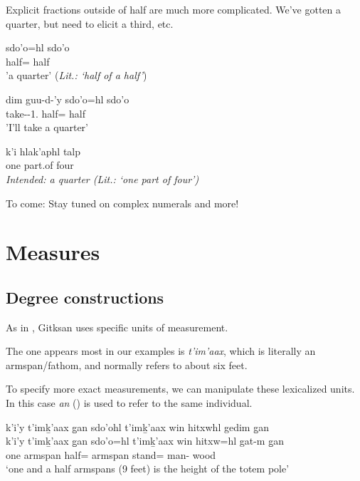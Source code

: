 \documentclass{article}
\begin{document}
Explicit fractions outside of half are much more complicated. We've gotten a quarter, but need to elicit a third, etc.
\begin{exe}
    \ex \begin{xlist}
    \item \gll sdo'o=hl sdo'o\\
half=\Cn{} half\\
'a quarter' (\textit{Lit.: `half of a half'})
\item \gll dim guu-d-'y sdo'o=hl sdo'o\\
\Fut{} take-\T{}-1.\Ii{} half=\Cn{} half\\
'I'll take a quarter'
\item \gll * k'i hlak'aphl talp \\
{} one part.of four\\
\textit{Intended: a quarter (Lit.: `one part of four')}
    \end{xlist} 
\end{exe}
To come: Stay tuned on complex numerals and more!

\section{Measures}
\subsection{Degree constructions}

As in \textcite{aonukiDifferentialMeasurePhrases2025}, Gitksan uses specific units of measurement. 

The one appears most in our examples is \textit{t'im'aax}, which is literally an armspan/fathom, and normally refers to about six feet.

To specify more exact measurements, we can manipulate these lexicalized units. In this case \textit{an} (\Pcnj{}) is used to refer to the same individual.

\begin{exe}
    \ex \glll 
    k'i'y t’imḵ’aax g̱an sdo'ohl t’imḵ’aax win hitxwhl gedim g̱an \\
    k'i'y t’imḵ’aax g̱an sdo'o=hl t’imḵ’aax win hitxw=hl gat-m g̱an \\
    one armspan \Pcnj{} half=\Cn{} armspan \Comp{} stand=\Cn{} man-\Attr{} wood \\
    \glt `one and a half armspans (9 feet) is the height of the totem pole'
\end{exe}
\end{document}
